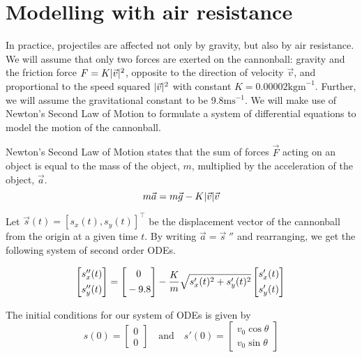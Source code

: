 \section{Modelling with air resistance}
In practice, projectiles are affected not only by gravity, but also by air resistance. We will assume that only two forces are exerted on the cannonball: gravity and the friction force $F  = K \lvert\vec{v}\rvert^2$, opposite to the direction of velocity $\vec{v}$, and proportional to the speed squared $\lvert\vec{v}\rvert^2$ with constant $K = 0.00002\text{kgm}^{-1}$. Further, we will assume the gravitational constant to be 9.8$\text{ms}^{-1}$. We will make use of Newton's Second Law of Motion to formulate a system of differential equations to model the motion of the cannonball.



\noindent
Newton's Second Law of Motion states that the sum of forces $\vec{F}$ acting on an object is equal to the mass of the object, $m$, multiplied by the acceleration of the object, $\vec{a}$.
$$m\vec{a} = m\vec{g} - K\lvert\vec{v}\rvert\vec{v}$$

\noindent
Let $\vec{s}(t) = [s_x(t), s_y(t)]^\top$ be the displacement vector of the cannonball from the origin at a given time $t$. By writing $\vec{a} = \vec{s}\;''$ and rearranging, we get the following system of second order ODEs.

$$
\begin{bmatrix}
	\matrixspacinghack s''_x(t) \\
	\matrixspacinghack s''_y(t) 	
\end{bmatrix}
=
\begin{bmatrix}
	\matrixspacinghack 0 \\
	\matrixspacinghack -9.8	
\end{bmatrix}
-
\frac{K}{m}\sqrt{s'_x(t)^2 + s'_y(t)^2}
\begin{bmatrix}
	\matrixspacinghack s'_x(t) \\
	\matrixspacinghack s'_y(t)	
\end{bmatrix} \\
$$


\noindent
The initial conditions for our system of ODEs is given by
$$s(0) = \begin{bmatrix} 0 \\ 0 \end{bmatrix} \quad \text{and} \quad s'(0) = \begin{bmatrix} v_0 \cos \theta \\ v_0 \sin \theta \end{bmatrix}$$

